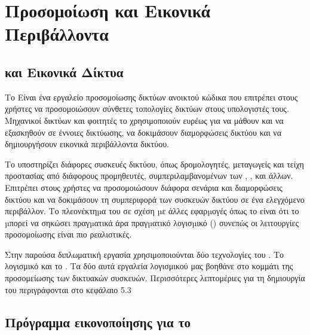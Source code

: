 

\section{Προσομοίωση και Εικονικά Περιβάλλοντα}

\subsection{ και Εικονικά Δίκτυα}

Το  Είναι ένα εργαλείο προσομοίωσης δικτύων ανοικτού κώδικα που επιτρέπει στους χρήστες να προσομοιώσουν 
σύνθετες τοπολογίες δικτύων στους υπολογιστές τους. Μηχανικοί δικτύων και φοιτητές 
το χρησιμοποιούν ευρέως για να μάθουν και να εξασκηθούν σε έννοιες δικτύωσης, να δοκιμάσουν διαμορφώσεις δικτύου και να δημιουργήσουν εικονικά περιβάλλοντα δικτύου.


Το  υποστηρίζει διάφορες συσκευές δικτύου, όπως δρομολογητές, μεταγωγείς και τείχη προστασίας 
από διάφορους προμηθευτές, συμπεριλαμβανομένων των , ,  και άλλων. Επιτρέπει στους χρήστες να 
προσομοιώσουν διάφορα σενάρια και διαμορφώσεις δικτύου και να δοκιμάσουν τη συμπεριφορά των 
συσκευών δικτύου σε ένα ελεγχόμενο περιβάλλον. Το πλεονέκτηµα του  σε σχέση µε άλλες εφαρµογές όπως το  είναι ότι το  µπορεί να σηκώσει πραγµατικά  άρα πραγµατικό λογισµικό () συνεπώς οι λειτουργίες προσομοίωσης είναι πιο ρεαλιστικές.

Στην παρούσα διπλωματική εργασία χρησιμοποιούνται δύο τεχνολογίες του . Το  λογισμικό και το . Τα δύο αυτά εργαλεία λογισμικού μας βοηθάνε στο κομμάτι της προσομείωσης των δικτυακών συσκευών. Περισσότερες λεπτομέριες για τη δημιουργία του  περιγράφονται στο κεφάλαιο 5.3

\subsection{Πρόγραμμα εικονοποίησης για το }

